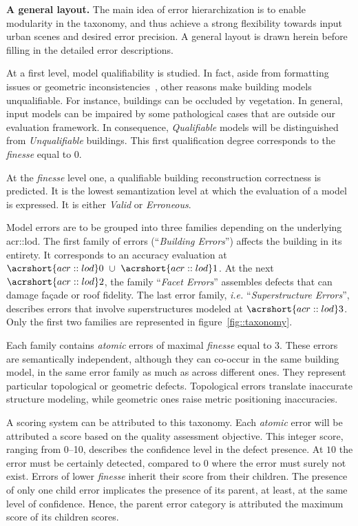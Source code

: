 \documentclass[runningheads]{llncs}
\begin{document}
\noindent
\textbf{A general layout.}
The main idea of error hierarchization is to enable modularity in the taxonomy, and thus achieve a strong flexibility towards input urban scenes and desired error precision. A general layout is drawn herein before filling in the detailed error descriptions.

At a first level, model qualifiability is studied. In fact, aside from formatting issues or geometric inconsistencies~\cite{ledoux2018val3dity}, other reasons make building models unqualifiable. For instance, buildings can be occluded by vegetation. In general, input models can be impaired by some pathological cases that are outside our evaluation framework. In consequence, \textit{Qualifiable} models will be distinguished from \textit{Unqualifiable} buildings. This first qualification degree corresponds to the \textit{finesse} equal to $0$.

At the \textit{finesse} level one, a qualifiable building reconstruction correctness is predicted. It is the lowest semantization level at which the evaluation of a model is expressed. It is either \textit{Valid} or \textit{Erroneous}.

Model errors are to be grouped into three families depending on the underlying \acrshort{acr::lod}. The first family of errors (``\textit{Building Errors}'') affects the building in its entirety. It corresponds to an accuracy evaluation at $\acrshort{acr::lod}0\text{ } \cup \text{ }\acrshort{acr::lod}1$. At the next $\acrshort{acr::lod}2$, the family ``\textit{Facet Errors}'' assembles defects that can damage fa\c{c}ade or roof fidelity. The last error family, \textit{i.e.} ``\textit{Superstructure Errors}'', describes errors that involve superstructures modeled at $\acrshort{acr::lod}3$. Only the first two families are represented in figure~\ref{fig::taxonomy}.

Each family contains \textit{atomic} errors of maximal \textit{finesse} equal to $3$. These errors are semantically independent, although they can co-occur in the same building model, in the same error family as much as across different ones. They represent particular topological or geometric defects. Topological errors translate inaccurate structure modeling, while geometric ones raise metric positioning inaccuracies.

A scoring system can be attributed to this taxonomy. Each \textit{atomic} error will be attributed a score based on the quality assessment objective. This integer score, ranging from \SIrange{0}{10}{}, describes the confidence level in the defect presence. At $10$ the error must be certainly detected, compared to $0$ where the error must surely not exist. Errors of lower \textit{finesse} inherit their score from their children. The presence of only one child error implicates the presence of its parent, at least, at the same level of confidence. Hence, the parent error category is attributed the maximum score of its children scores.
\end{document}
